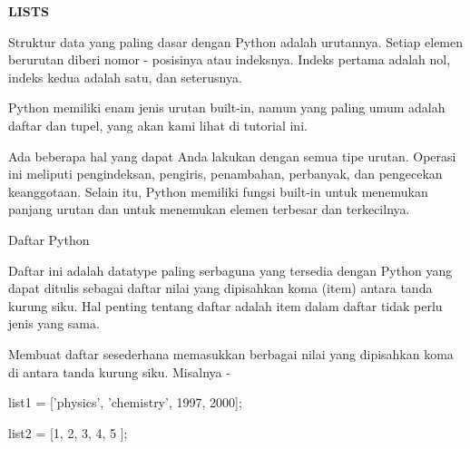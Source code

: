 \documentclass[a4paper,12pt]{report}
\begin{document}
\sloppy
\begin{center}{\fontsize{14pt}{14pt}\selectfont \textbf{LISTS} \\}\end{center} \par
\noindent 
{\fontsize{14pt}{14pt}\selectfont Struktur data yang paling dasar dengan Python adalah urutannya. Setiap elemen berurutan diberi nomor - posisinya atau indeksnya. Indeks pertama adalah nol, indeks kedua adalah satu, dan seterusnya. \\} \par
\vspace{14pt}
\noindent 
{\fontsize{14pt}{14pt}\selectfont Python memiliki enam jenis urutan built-in, namun yang paling umum adalah daftar dan tupel, yang akan kami lihat di tutorial ini. \\} \par
\noindent 
{\fontsize{14pt}{14pt}\selectfont Ada beberapa hal yang dapat Anda lakukan dengan semua tipe urutan. Operasi ini meliputi pengindeksan, pengiris, penambahan, perbanyak, dan pengecekan keanggotaan. Selain itu, Python memiliki fungsi built-in untuk menemukan panjang urutan dan untuk menemukan elemen terbesar dan terkecilnya. \\} \par
\vspace{14pt}
\noindent 
{\fontsize{14pt}{14pt}\selectfont Daftar Python \\} \par
\vspace{14pt}
\noindent 
{\fontsize{14pt}{14pt}\selectfont Daftar ini adalah datatype paling serbaguna yang tersedia dengan Python yang dapat ditulis sebagai daftar nilai yang dipisahkan koma (item) antara tanda kurung siku. Hal penting tentang daftar adalah item dalam daftar tidak perlu jenis yang sama. \\} \par
\noindent 
{\fontsize{14pt}{14pt}\selectfont Membuat daftar sesederhana memasukkan berbagai nilai yang dipisahkan koma di antara tanda kurung siku. Misalnya - \\} \par
\noindent 
\vspace{14pt}
\noindent 
{\fontsize{14pt}{14pt}\selectfont list1 = ['physics', 'chemistry', 1997, 2000]; \\} \par
\noindent 
{\fontsize{14pt}{14pt}\selectfont list2 = [1, 2, 3, 4, 5 ]; \\} \par
\end{document}
